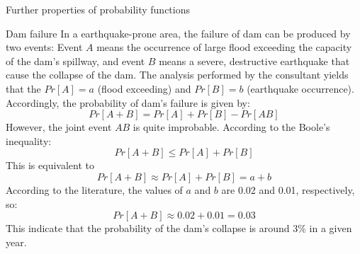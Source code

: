 \documentclass[8pt]{beamer}
\renewcommand{\emph}[1]{\textcolor{myorange}{#1}}
\begin{document}
\begin{frame}{Further properties of probability functions}
    \begin{exampleblock}{Dam failure}
        In a earthquake-prone area, the failure of dam can be produced by two events: Event $A$ means the occurrence of large flood exceeding the capacity of the dam's spillway, and event $B$ means a severe, destructive earthquake that cause the collapse of the dam. The analysis performed by the consultant yields that the $Pr[A] = a$ (flood exceeding) and $Pr[B] = b$ (earthquake occurrence). Accordingly, the probability of dam's failure is given by:
        $$
        Pr[A + B] = Pr[A] + Pr[B] - Pr[AB]
        $$
        However, the joint event $AB$ is quite improbable. According to the \emph{Boole's inequality}:
        $$
        Pr[A + B] \leq Pr[A] + Pr[B]
        $$
        This is equivalent to 
        $$
        Pr[A + B] \approx Pr[A] + Pr[B] = a + b
        $$
        According to the literature, the values of $a$ and $b$ are 0.02 and 0.01, respectively, so:
        $$
        Pr[A + B] \approx 0.02 + 0.01 = 0.03
        $$
        This indicate that the probability of the dam's collapse is around 3\% in a given year. 
    \end{exampleblock}
\end{frame}
\end{document}
